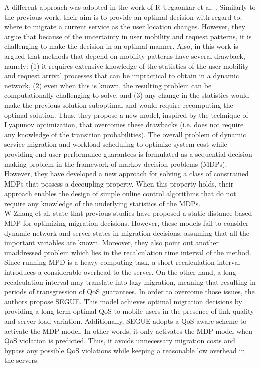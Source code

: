 \noindent\tab A different approach was adopted in the work of R Urgaonkar et al. \cite{urgaonkar2015dynamic}. Similarly to the previous work, their aim is to provide an optimal decision with regard to: where to migrate a current service as the user location changes. However, they argue that because of the uncertainty in user mobility and request patterns, it is challenging to make the decision in an optimal manner. Also, in this work is argued that methods that depend on mobility patterns have several drawback, namely: (1) it requires extensive knowledge of the statistics of the user mobility and request arrival processes that can be impractical to obtain in a dynamic network, (2) even when this is known, the resulting problem can be computationally challenging to solve, and (3) any change in the statistics would make the previous solution suboptimal and would require recomputing the optimal solution. Thus, they propose a new model, inspired by the technique of Lyapunov optimization, that overcomes these drawbacks (i.e. does not require any knowledge of the transition probabilities). The overall problem of dynamic service migration and workload scheduling to optimize system cost while providing end user performance guarantees is formulated as a sequential decision making problem in the framework of markov decision problems (MDPs). However, they have developed a new approach for solving a class of constrained MDPs that possess a decoupling property. When this property holds, their approach enables the design of simple online control algorithms that do not require any knowledge of the underlying statistics of the MDPs.\\

\noindent\tab W Zhang et al. \cite{zhang2016segue} state that previous studies have proposed a static distance-based MDP for optimizing migration decisions. However, these models fail to consider dynamic network and server states in migration decisions, assuming that all the important variables are known. Moreover, they also point out another unaddressed problem which lies in the recalculation time interval of the method. Since running MPD is a heavy computing task, a short recalculation interval introduces a considerable overhead to the server. On the other hand, a long recalculation interval may translate into lazy migration, meaning that resulting in periods of transgression of QoS guarantees. In order to overcome those issues, the authors propose SEGUE. This model achieves optimal migration decisions by providing a long-term optimal QoS to mobile users in the presence of link quality and server load variation. Additionally, SEGUE adopts a QoS aware scheme to activate the MDP model. In other words, it only activates the MDP model when QoS violation is predicted. Thus, it avoids unnecessary migration costs and bypass any possible QoS violations while keeping a reasonable low overhead in the servers.\\

